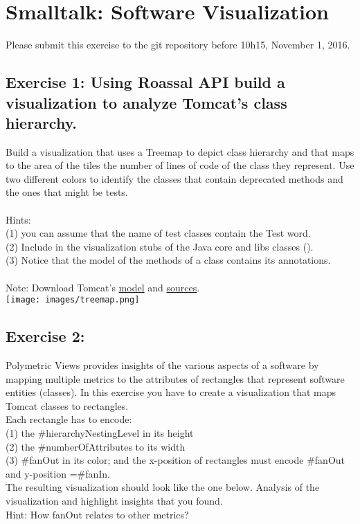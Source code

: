 \documentclass [11pt, a4wide, twoside]{article}
\begin{document}
\section*{Smalltalk: Software Visualization}


Please submit this exercise to the git repository before 10h15, November 1, 2016.

\subsection*{Exercise 1: Using Roassal API build a visualization to analyze Tomcat's class hierarchy.}

Build a visualization that uses a Treemap to depict class hierarchy and that maps to the area of the tiles the number of lines of code of the class they represent. Use two different colors to identify the classes that contain deprecated methods and the ones that might be tests. \\ \\
Hints: \\
(1) you can assume that the name of test classes contain the Test word. \\
(2) Include in the visualization stubs of the Java core and libs classes (\eg {}).\\ 
(3) Notice that the model of the methods of a class contains its annotations.\\ \\
Note: Download Tomcat's \href{http://scg.unibe.ch/download/merino/roassal-tutorial/tomcat-7.0.2.mse}{model} and \href{http://scg.unibe.ch/download/merino/roassal-tutorial/tomcat-7.0.2-src.zip}{sources}. \\

\texttt{[image: images/treemap.png]}

\subsection*{Exercise 2:}
Polymetric Views provides insights of the various aspects of a software by mapping multiple metrics to the attributes of rectangles that represent software entities (\eg classes). In this exercise you have to create a visualization that maps Tomcat classes to rectangles. \\
Each rectangle has to encode: \\
(1) the \#hierarchyNestingLevel in its height\\ 
(2) the \#numberOfAttributes to its width \\
(3) \#fanOut in its color; and the x-position of rectangles must encode \#fanOut and y-position =\#fanIn. \\
The resulting visualization should look like the one below. Analysis of the visualization and highlight insights that you found. \\
Hint: How fanOut relates to other metrics?
\end{document}
